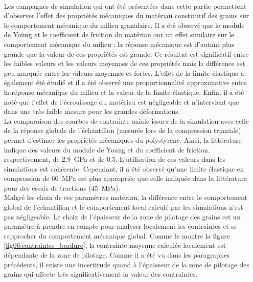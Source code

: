 	\paragraph{}
		Les campagnes de simulation qui ont été présentées dans cette partie permettent d'observer l'effet des propriétés mécaniques du matériau constitutif des grains sur le comportement mécanique du milieu granulaire. Il a été observé que le module de Young et le coefficient de friction du matériau ont un effet similaire sur le comportement mécanique du milieu : la réponse mécanique est d'autant plus grande que la valeur de ces propriétés est grande. Ce résultat est significatif entre les faibles valeurs et les valeurs moyennes de ces propriétés mais la différence est peu marquée entre les valeurs moyennes et fortes. L'effet de la limite élastique a également été étudié et il a été observé une proportionnalité approximative entre la réponse mécanique du milieu et la valeur de la limite élastique. Enfin, il a été noté que l'effet de l'écrouissage du matériau est négligeable et n'intervient que dans une très faible mesure pour les grandes déformations.
		\\La comparaison des courbes de contrainte axiale issues de la simulation avec celle de la réponse globale de l'échantillon (mesurée lors de la compression triaxiale) permet d'estimer les propriétés mécaniques du polystyrène. Ainsi, la littérature \citep{wypych_handbook_2016, matweb} indique des valeurs du module de Young et du coefficient de friction, respectivement, de \SI{2.9}{\giga\pascal} et de \num{0.5}. L'utilisation de ces valeurs dans les simulations est cohérente. Cependant, il a été observé qu'une limite élastique en compression de \SI{60}{\mega\pascal} est plus appropriée que celle indiquée dans la littérature pour des essais de tractions (\SI{45}{\mega\pascal}).
		\\Malgré les choix de ces paramètres matériau, la différence entre le comportement global de l'échantillon et le comportement local calculé par les simulations n'est pas négligeable. Le choix de l'épaisseur de la zone de pilotage des grains est un paramètre à prendre en compte pour analyser localement les contraintes et se rapprocher du comportement mécanique global. Comme le montre la figure \ref{fig06:contraintes_bordure}, la contrainte moyenne calculée localement est dépendante de la zone de pilotage. Comme il a été vu dans les paragraphes précédents, il existe une incertitude quand à l'épaisseur de la zone de pilotage des grains qui affecte très significativement la valeur des contraintes.

